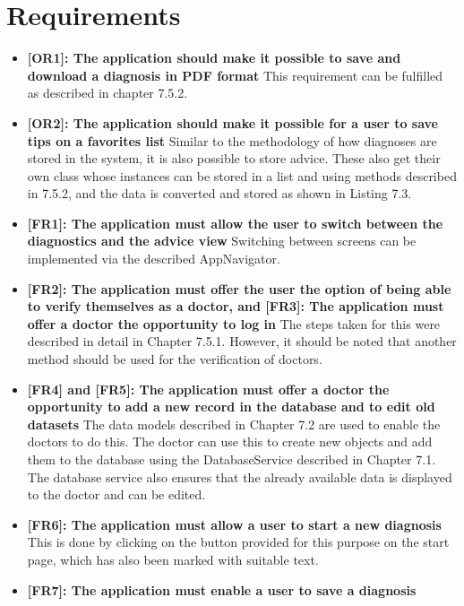\section{Requirements}
\begin{itemize}
	\item \textbf{[OR1]: The application should make it possible to save and download a diagnosis in PDF format}
	\newline
	This requirement can be fulfilled as described in chapter 7.5.2.
	\item \textbf{[OR2]: The application should make it possible for a user to save tips on a favorites list}
	\newline
	Similar to the methodology of how diagnoses are stored in the system, it is also possible to store advice. These also get their own class whose instances can be stored in a list and using methods described in 7.5.2, and the data is converted and stored as shown in Listing 7.3.
	\item \textbf{[FR1]: The application must allow the user to switch between the diagnostics and the advice view}
	\newline
	Switching between screens can be implemented via the described AppNavigator. 
	\item \textbf{[FR2]: The application must offer the user the option of being able to verify themselves as a doctor, and [FR3]: The application must offer a doctor the opportunity to log in}
	\newline
	The steps taken for this were described in detail in Chapter 7.5.1. However, it should be noted that another method should be used for the verification of doctors.
	\item \textbf{[FR4] and [FR5]: The application must offer a doctor the opportunity to add a new record in the database and to edit old datasets}
	\newline
	The data models described in Chapter 7.2 are used to enable the doctors to do this. The doctor can use this to create new objects and add them to the database using the DatabaseService described in Chapter 7.1. The database service also ensures that the already available data is displayed to the doctor and can be edited.
	\item \textbf{[FR6]: The application must allow a user to start a new diagnosis}
	\newline
	This is done by clicking on the button provided for this purpose on the start page, which has also been marked with suitable text.
	\item \textbf{[FR7]: The application must enable a user to save a diagnosis}

\end{itemize}
